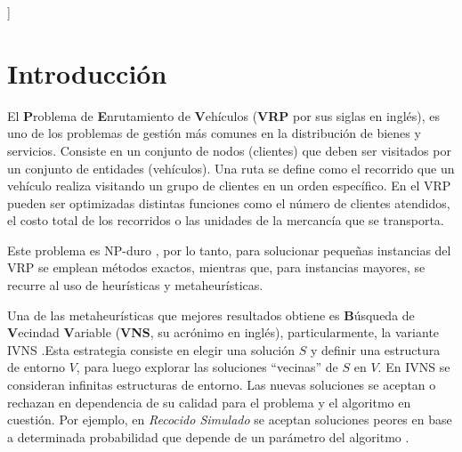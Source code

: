 \documentclass[a4paper,10pt,twocolumn]{article}
\begin{document}
\vspace{0.8cm}
]



\section{Introducción}\label{sec:intro}
  El \textbf{P}roblema de \textbf{E}nrutamiento de \textbf{V}ehículos
  (\textbf{VRP} por sus siglas en inglés), es uno de los problemas de gestión más
  comunes en la distribución de bienes y servicios. Consiste en un conjunto de
  nodos (clientes) que deben ser visitados por un conjunto de entidades (vehículos).
  Una ruta se define como el recorrido que un vehículo realiza visitando un grupo de
  clientes en un orden específico. En el VRP pueden ser optimizadas distintas 
  funciones como el número de clientes atendidos, el costo total de los recorridos o 
  las unidades de la mercancía que se transporta.
  
  Este problema es NP-duro \cite{Paolo}, por lo tanto, para solucionar pequeñas 
  instancias del VRP se emplean métodos exactos, mientras que, para instancias mayores, 
  se recurre al uso de heurísticas y metaheurísticas.
  
  Una de las metaheurísticas que mejores resultados obtiene es \textbf{B}úsqueda de
  \textbf{V}ecindad \textbf{V}ariable \cite{Mla} (\textbf{VNS}, su acrónimo en inglés),
  particularmente, la variante IVNS \cite{Camila}.Esta estrategia consiste en elegir 
  una solución $ S $ y definir una estructura de entorno $ V $, para luego explorar las 
  soluciones ``vecinas'' de $ S $ en $ V $. En IVNS se consideran infinitas estructuras
  de entorno. Las nuevas soluciones se aceptan o rechazan en dependencia de su calidad 
  para el problema y el algoritmo en cuestión. Por ejemplo, en \textit{Recocido Simulado} 
  se aceptan soluciones peores en base a determinada probabilidad que depende de un 
  parámetro del algoritmo \cite{Alina}.
  
\end{document}
